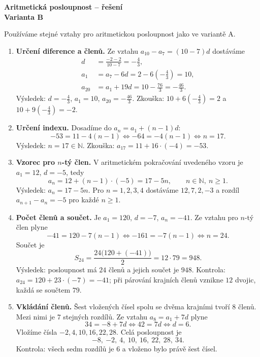 \documentclass[a4paper,11pt]{article}
\begin{document}
\newpage
\begin{center}
    {\Large\bfseries Aritmetická posloupnost -- řešení}\\[2mm]
    {\bfseries Varianta B}
\end{center}

Používáme stejné vztahy pro aritmetickou posloupnost jako ve variantě A.

\begin{enumerate}
    \item \textbf{Určení diference a členů.}
    Ze vztahu $a_{10}-a_7=(10-7)d$ dostáváme
    \begin{align*}
        d&=\frac{-2-2}{10-7}=-\frac43,\\
        a_1&=a_7-6d=2-6\left(-\frac43\right)=10,\\
        a_{20}&=a_1+19d=10-\frac{76}{3}=-\frac{46}{3}.
    \end{align*}
    Výsledek: $d=-\frac43$, $a_1=10$, $a_{20}=-\frac{46}{3}$.
    Zkouška: $10+6\left(-\frac43\right)=2$ a
    $10+9\left(-\frac43\right)=-2$.

    \item \textbf{Určení indexu.}
    Dosadíme do $a_n=a_1+(n-1)d$:
    \[
        -53=11-4(n-1) \iff -64=-4(n-1) \iff n=17.
    \]
    Výsledek: $n=17\in\mathbb N$.
    Zkouška: $a_{17}=11+16\cdot(-4)=-53$.

    \item \textbf{Vzorec pro $n$-tý člen.}
    V aritmetickém pokračování uvedeného vzoru je $a_1=12$, $d=-5$, tedy
    \[
        a_n=12+(n-1)\cdot(-5)=17-5n,\qquad n\in\mathbb N,\ n\ge1.
    \]
    Výsledek: $a_n=17-5n$.
    Pro $n=1,2,3,4$ dostáváme $12,7,2,-3$ a rozdíl
    $a_{n+1}-a_n=-5$ pro každé $n\ge1$.

    \item \textbf{Počet členů a součet.}
    Je $a_1=120$, $d=-7$, $a_n=-41$. Ze vztahu pro $n$-tý člen plyne
    \[
        -41=120-7(n-1) \iff -161=-7(n-1) \iff n=24.
    \]
    Součet je
    \[
        S_{24}=\frac{24\bigl(120+(-41)\bigr)}2=12\cdot79=948.
    \]
    Výsledek: posloupnost má $24$ členů a jejich součet je $948$.
    Kontrola: $a_{24}=120+23\cdot(-7)=-41$; při párování krajních členů
    vznikne $12$ dvojic, každá se součtem $79$.

    \item \textbf{Vkládání členů.}
    Šest vložených čísel spolu se dvěma krajními tvoří $8$ členů.
    Mezi nimi je $7$ stejných rozdílů. Ze vztahu $a_8=a_1+7d$ plyne
    \[
        34=-8+7d \iff 42=7d \iff d=6.
    \]
    Vložíme čísla $-2,4,10,16,22,28$. Celá posloupnost je
    \[
        -8,\ {-2},\ 4,\ 10,\ 16,\ 22,\ 28,\ 34.
    \]
    Kontrola: všech sedm rozdílů je $6$ a vloženo bylo právě šest čísel.
\end{enumerate}
\end{document}
